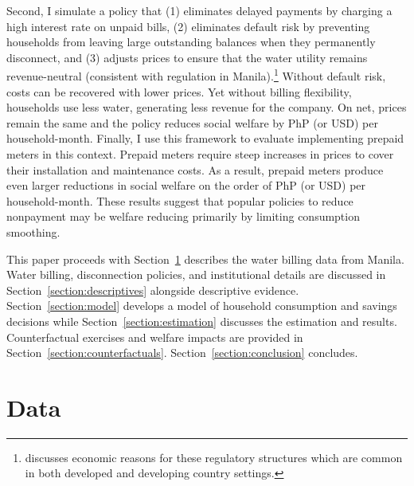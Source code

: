 \documentclass[12pt]{article}
\begin{document}
Second, I simulate a policy that (1) eliminates delayed payments by charging a high interest rate on unpaid bills, (2) eliminates default risk by preventing households from leaving large outstanding balances when they permanently disconnect, and (3) adjusts prices to ensure that the water utility remains revenue-neutral (consistent with regulation in Manila).\footnote{\cite{laffont2005regulation} discusses economic reasons for these regulatory structures which are common in both developed and developing country settings.}  Without default risk, costs can be recovered with lower prices. Yet without billing flexibility, households use less water, generating less revenue for the company.  On net, prices remain the same and the policy reduces social welfare by PhP (or USD) per household-month.  Finally, I use this framework to evaluate implementing prepaid meters in this context.  Prepaid meters require steep increases in prices to cover their installation and maintenance costs.  As a result, prepaid meters produce even larger reductions in social welfare on the order of PhP (or USD) per household-month.  These results suggest that popular policies to reduce nonpayment may be welfare reducing primarily by limiting consumption smoothing.

This paper proceeds with Section~\ref{section:data} describes the water billing data from Manila.  Water billing, disconnection policies, and institutional details are discussed in Section~\ref{section:descriptives} alongside descriptive evidence.  Section~\ref{section:model} develops a model of household consumption and savings decisions while Section~\ref{section:estimation} discusses the estimation and results.  Counterfactual exercises and welfare impacts are provided in Section~\ref{section:counterfactuals}.  Section~\ref{section:conclusion} concludes.

\section{Data}\label{section:data}

\end{document}
